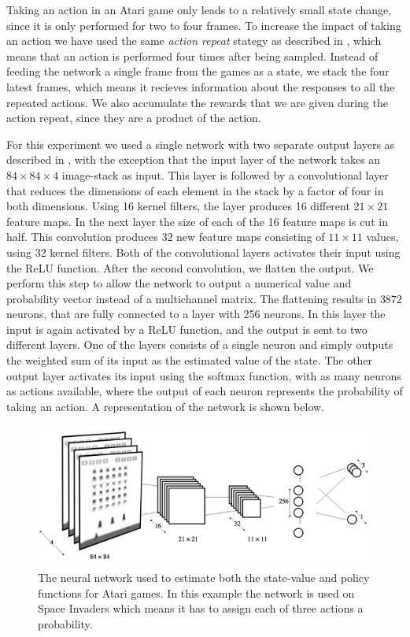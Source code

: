 \documentclass[11pt]{article}
\begin{document}
Taking an action in an Atari game only leads to a relatively small state change,
since it is only performed for two to four frames.
To increase the impact of taking an action we have used the same \textit{action repeat}
stategy as described in \cite{a3c}, which means that an action is performed four times
after being sampled.
Instead of feeding the network a single frame from the games as a state,
we stack the four latest frames, which means it recieves information about the responses to
all the repeated actions.
We also accumulate the rewards that we are given during the action repeat,
since they are a product of the action.

For this experiment we used a single network with two separate
output layers as described in \cite{a3c}, with the exception that
the input layer of the network takes an $84 \times 84 \times 4$
image-stack as input.
This layer is followed by a convolutional layer that reduces the dimensions
of each element in the stack by a factor of four in both dimensions.
Using 16 kernel filters, the layer produces 16 different
$21 \times 21$ feature maps.
In the next layer the size of each of the 16 feature maps is
cut in half.
This convolution produces 32 new feature maps consisting of $11 \times 11$ values,
using 32 kernel filters.
Both of the convolutional layers activates
their input using the ReLU function.
After the second convolution, we flatten the output.
We perform this step to allow the network to output a numerical value and
probability vector instead of a multichannel matrix.
The flattening results in $3872$ neurons, that are fully connected to
a layer with 256 neurons.
In this layer the input is again activated by a ReLU function,
and the output is sent to two different layers.
One of the layers consists of a single neuron
and simply outputs the weighted sum of its input as the estimated value
of the state.
The other output layer activates its input using the softmax function,
with as many neurons as actions available, where
the output of each neuron represents the probability of taking an action.
A representation of the network is shown below.

\begin{figure}[H]
    \centering
    \includegraphics[scale=0.25]{include/Atari_network.png}
    \caption{The neural network used to estimate both the state-value
             and policy functions for Atari games. In this example the network
             is used on Space Invaders which means it has to assign each of three actions a probability.}
    \label{fig:atari_network}
\end{figure}
\end{document}
